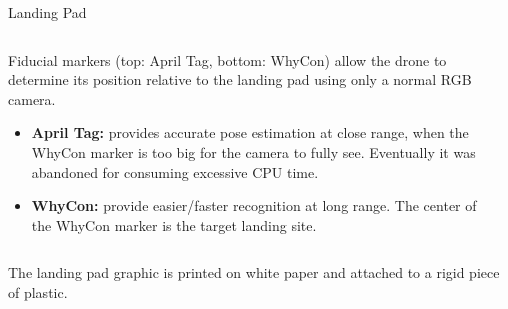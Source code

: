 \documentclass[final, 20pt]{beamer}
\newlength{\colwidth}
\begin{document}
\begin{frame}[t]
\begin{columns}[t]
\begin{column}{\colwidth}
  \begin{block}{Landing Pad}

    \vspace{0.5cm}
    \begin{columns}
      \begin{column}{0.65\textwidth}
        Fiducial markers (top: April Tag\cite{apriltag_paper}, bottom: WhyCon\cite{whycon_paper}) allow the drone to determine its position relative to the landing pad using only a normal RGB camera.

        \begin{itemize}
          \item \textbf{April Tag:} provides accurate pose estimation at close range, when the WhyCon marker is too big for the camera to fully see. Eventually it was abandoned for consuming excessive CPU time.
          \item \textbf{WhyCon:} provide easier/faster recognition at long range. The center of the WhyCon marker is the target landing site.
        \end{itemize}
      \end{column}
      \begin{column}{0.3\textwidth}
      \end{column}
    \end{columns}

    The landing pad graphic is printed on white paper and attached to a rigid piece of plastic.

  \end{block}


\end{column}
\end{columns}
\end{frame}
\end{document}
